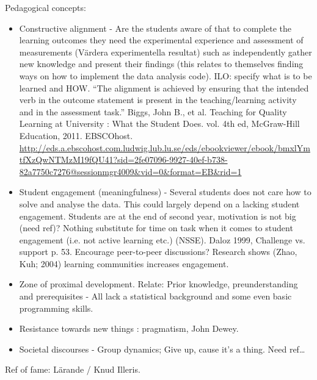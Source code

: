 \documentclass[]{article}
\begin{document}
Pedagogical concepts:
\begin{itemize}
  \item Constructive alignment - Are the students aware of that to complete the learning outcomes they need the experimental experience and assessment of measurements (Värdera experimentella resultat) such as independently gather new knowledge and present their findings (this relates to themselves finding ways on how to implement the data analysis code). ILO: specify what is to be learned and HOW. ``The alignment is achieved by ensuring that the intended verb in the outcome statement is present in the teaching/learning activity and in the assessment task.''
    Biggs, John B., et al. Teaching for Quality Learning at University : What the Student Does. vol. 4th ed, McGraw-Hill Education, 2011. EBSCOhost.
    \url{http://eds.a.ebscohost.com.ludwig.lub.lu.se/eds/ebookviewer/ebook/bmxlYmtfXzQwNTMzM19fQU41?sid=2fe07096-9927-40ef-b738-82a7750c7276@sessionmgr4009&vid=0&format=EB&rid=1}
  \item Student engagement (meaningfulness) - Several students does not care how to solve and analyse the data. This could largely depend on a lacking student engagement. Students are at the end of second year, motivation is not big (need ref)? Nothing substitute for time on task when it comes to student engagement (i.e. not active learning etc.) (NSSE). Daloz 1999, Challenge vs. support p. 53. Encourage peer-to-peer discussions? Research shows (Zhao, Kuh; 2004) learning communities increases engagement.
  \item Zone of proximal development. Relate: Prior knowledge, preunderstanding and prerequisites - All lack a statistical background and some even basic programming skills.
  \item Resistance towards new things : pragmatism, John Dewey.
  \item Societal discourses - Group dynamics; Give up, cause it's a thing. Need ref\dots
\end{itemize}

Ref of fame: Lärande / Knud Illeris.
\end{document}
